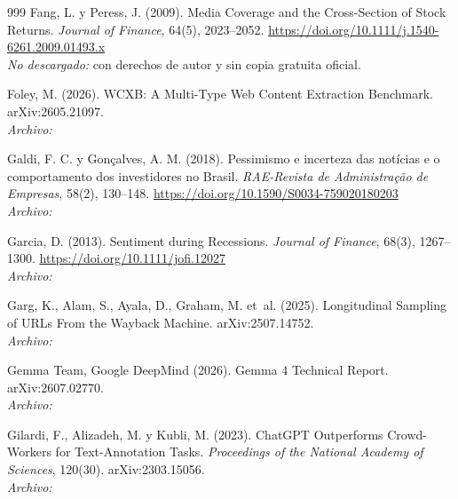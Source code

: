 \begin{thebibliography}{999}
Fang, L. y Peress, J. (2009). Media Coverage and the Cross-Section of Stock Returns. \emph{Journal of Finance}, 64(5), 2023--2052. \url{https://doi.org/10.1111/j.1540-6261.2009.01493.x}
\\\textit{No descargado:} con derechos de autor y sin copia gratuita oficial.

Foley, M. (2026). {WCXB}: A Multi-Type Web Content Extraction Benchmark. arXiv:2605.21097.
\\\textit{Archivo:} 

Galdi, F. C. y Gon{\c{c}}alves, A. M. (2018). Pessimismo e incerteza das not{\'i}cias e o comportamento dos investidores no {Brasil}. \emph{RAE-Revista de Administra{\c{c}}{\~a}o de Empresas}, 58(2), 130--148. \url{https://doi.org/10.1590/S0034-759020180203}
\\\textit{Archivo:} 

Garcia, D. (2013). Sentiment during Recessions. \emph{Journal of Finance}, 68(3), 1267--1300. \url{https://doi.org/10.1111/jofi.12027}
\\\textit{Archivo:} 

Garg, K., Alam, S., Ayala, D., Graham, M. et~al. (2025). Longitudinal Sampling of {URLs} From the {Wayback Machine}. arXiv:2507.14752.
\\\textit{Archivo:} 

Gemma Team, Google DeepMind (2026). Gemma 4 Technical Report. arXiv:2607.02770.
\\\textit{Archivo:} 

Gilardi, F., Alizadeh, M. y Kubli, M. (2023). {ChatGPT} Outperforms Crowd-Workers for Text-Annotation Tasks. \emph{Proceedings of the National Academy of Sciences}, 120(30). arXiv:2303.15056.
\\\textit{Archivo:} 


\end{thebibliography}

